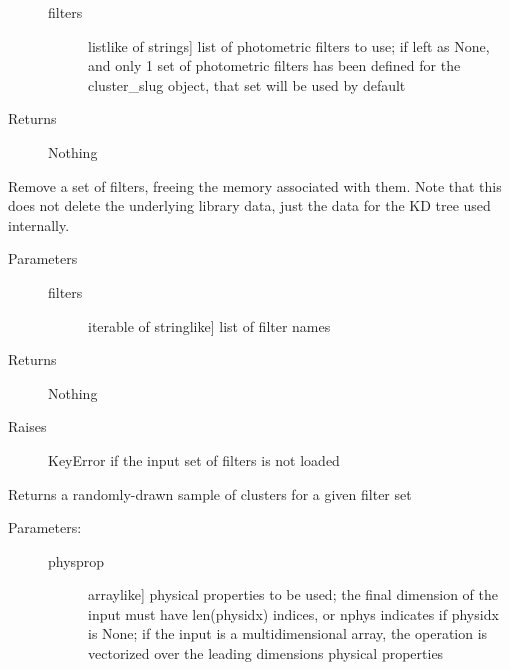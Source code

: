 \documentclass[letterpaper,10pt,english]{sphinxmanual}
\begin{document}
\begin{fulllineitems}
\begin{fulllineitems}
\begin{description}
\begin{description}
\item[{filters}] \leavevmode{[}listlike of strings{]}
list of photometric filters to use; if left as None, and
only 1 set of photometric filters has been defined for
the cluster\_slug object, that set will be used by
default

\end{description}

\item[{Returns}] \leavevmode
Nothing

\end{description}

\end{fulllineitems}


\begin{fulllineitems}
\label{\detokenize{cluster_slug:slugpy.cluster_slug.cluster_slug.del_filters}}
Remove a set of filters, freeing the memory associated with
them. Note that this does not delete the underlying library
data, just the data for the KD tree used internally.
\begin{description}
\item[{Parameters}] \leavevmode\begin{description}
\item[{filters}] \leavevmode{[}iterable of stringlike{]}
list of filter names

\end{description}

\item[{Returns}] \leavevmode
Nothing

\item[{Raises}] \leavevmode
KeyError if the input set of filters is not loaded

\end{description}

\end{fulllineitems}


\begin{fulllineitems}
\label{\detokenize{cluster_slug:slugpy.cluster_slug.cluster_slug.draw_phot}}
Returns a randomly-drawn sample of clusters for a given filter
set
\begin{description}
\item[{Parameters:}] \leavevmode\begin{description}
\item[{physprop}] \leavevmode{[}arraylike{]}
physical properties to be used; the final dimension of
the input must have len(physidx) indices, or nphys
indicates if physidx is None; if the input is a
multidimensional array, the operation is vectorized over
the leading dimensions physical properties


\end{description}
\end{description}
\end{fulllineitems}
\end{fulllineitems}
\end{document}
